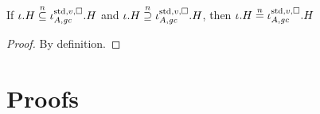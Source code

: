 \documentclass[a4paper]{article}
\begin{document}
\begin{lemma}
  \label{lem:nsub-and-nsup-std}
  If $\iota.H \nsubeq \stdreg{A,\gc}{v}.H$ and $\iota.H \nsupeq \stdreg{A,\gc}{v}.H$, then $\iota.H \nequal  \stdreg{A,\gc}{v}.H$
\end{lemma}
\begin{proof}
  By definition.
\end{proof}

\section{Proofs}





\end{document}

